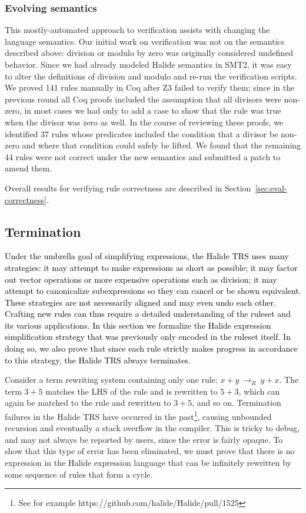 \documentclass[acmsmall,review]{acmart}\settopmatter{printfolios=true,printccs=false,printacmref=false}
\newcommand{\modified}[1]{\textcolor{black}{{#1}}}
\newcommand{\rewrites}[0]{\:\rightarrow_{R}\:}
\newcommand{\NumZdivCoqProvedRules}{{\color{black} 141}\xspace}
\newcommand{\NumZdivFalseRules}{{\color{black} 44}\xspace}
\newcommand{\NumZdivRelaxedPredicates}{{\color{black} 37}\xspace}
\begin{document}
\subsubsection{Evolving semantics}
\label{sub:evolvingsemantics}

This mostly-automated approach to verification assists with changing
the language semantics. Our initial work on verification was not on
the semantics described above: division or modulo by zero was originally
considered undefined behavior. Since we had already
modeled Halide semantics in SMT2, it was easy to alter the
definitions of division and modulo and re-run the verification scripts.
We proved \NumZdivCoqProvedRules rules manually in Coq after Z3 failed to verify them; 
since in the previous round all Coq proofs
included the assumption that all divisors were non-zero, in most cases
we had only to add a case to show that the rule was true when the
divisor was zero as well. In the course of reviewing
these proofs, we identified \NumZdivRelaxedPredicates rules whose
predicates included the condition that a divisor be non-zero and where
that condition could safely be lifted. We found that the remaining
\NumZdivFalseRules rules were not correct under the new semantics and
submitted a patch to amend them.

Overall results for verifying rule correctness are described in Section~\ref{sec:eval-correctness}.

\subsection{Termination}
\label{sec:termination}

\modified{Under the umbrella goal of simplifying expressions, the Halide TRS uses
many strategies: it may attempt to make expressions as short as possible; it may factor out
vector operations or more expensive operations such as division; it may attempt to
canonicalize subexpressions so they can cancel or be shown equivalent. These
strategies are not necessarily aligned and may even undo each other. Crafting new rules 
can thus require a detailed understanding of the ruleset and its various applications. 
In this section we formalize the Halide expression simplification strategy that was
previously only encoded in the ruleset itself. In doing so, we also prove that since 
each rule strictly makes progress in accordance to this strategy, the Halide TRS always terminates.}

Consider a term
rewriting system containing only one rule: $x + y \rewrites y + x$. The term
$3 + 5$ matches the LHS of the rule and is rewritten to $5 + 3$, which can again
be matched to the rule and rewritten to $3 + 5$, and so on. Termination failures in the Halide TRS have occurred in the past\footnote{See for example https://github.com/halide/Halide/pull/1525}, causing unbounded recursion and eventually a stack overflow in the compiler. This is tricky to debug, and may not always be reported by users, since the error is fairly opaque. To show that this type of error has been eliminated, we must prove that there is no expression in the Halide expression language that can be infinitely rewritten by some sequence of rules that form a cycle.
\end{document}

